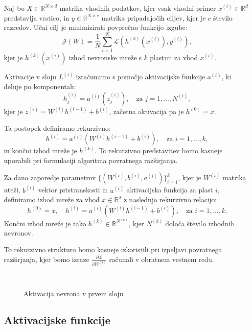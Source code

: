 Naj bo \( X \in \mathbb{R}^{N \times d} \) matrika vhodnih podatkov, kjer vsak vhodni primer \( x^{(i)} \in \mathbb{R}^d \) predstavlja vrstico, in \( y \in \mathbb{R}^{N \times c} \) matrika pripadajočih ciljev, kjer je \( c \) število razredov. Učni cilj je minimizirati povprečno funkcijo izgube:
\[
\mathcal{J}(W) = \frac{1}{N} \sum_{i=1}^N \mathcal{L}(h^{(k)}(x^{(i)}), y^{(i)}),
\]
kjer je \( h^{(k)}(x^{(i)}) \) izhod nevronske mreže s \( k \) plastmi za vhod \( x^{(i)} \).

Aktivacije v sloju \( L^{(i)} \) izračunamo s pomočjo aktivacijske funkcije \( a^{(i)} \), ki deluje po komponentah:
\[
h^{(i)}_j = a^{(i)}(z^{(i)}_j), \quad \text{za } j = 1, \dots, N^{(i)},
\]
kjer je \( z^{(i)} = W^{(i)} h^{(i-1)} + b^{(i)} \), začetna aktivacija pa je \( h^{(0)} = x \).

Ta postopek definiramo rekurzivno:
\[
h^{(i)} = a^{(i)}(W^{(i)} h^{(i-1)} + b^{(i)}), \quad \text{za } i = 1, \dots, k,
\]
in končni izhod mreže je \( h^{(k)} \). To rekurzivno predstavitev bomo kasneje uporabili pri formulaciji algoritma povratnega razširjanja.


Za dano zaporedje parametrov \( \{(W^{(i)}, b^{(i)}, a^{(i)})\}_{i=1}^k \), kjer je \( W^{(i)} \) matrika uteži, \( b^{(i)} \) vektor pristranskosti in \( a^{(i)} \) aktivacijska funkcija za plast \( i \), definiramo izhod mreže za vhod \( x \in \mathbb{R}^d \) z naslednjo rekurzivno relacijo:
\[
h^{(0)} = x, \quad h^{(i)} = a^{(i)}(W^{(i)} h^{(i-1)} + b^{(i)}), \quad \text{za } i = 1, \dots, k.
\]
Končni izhod mreže je tako \( h^{(k)} \in \mathbb{R}^{N^{(k)}} \), kjer \( N^{(k)} \) določa število izhodnih nevronov.

To rekurzivno strukturo bomo kasneje izkoristili pri izpeljavi povratnega razširjanja, kjer bomo izraze \( \frac{\partial \mathcal{L}}{\partial W^{(i)}} \) računali v obratnem vrstnem redu.


\begin{figure}[H]
  \centering
  \scalebox{0.85}{} %
  \caption{Aktivacija nevrona v prvem sloju}~\label{fig:nn-activation}
\end{figure}


\subsection*{Aktivacijske funkcije}

